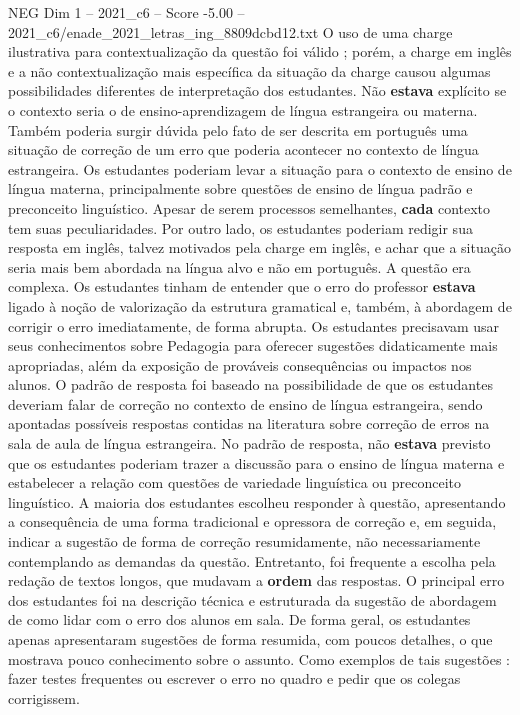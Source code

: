 \begin{textsample}{NEG Dim 1 – 2021\_c6 – Score -5.00 – 2021\_c6/enade\_2021\_letras\_ing\_8809dcbd12.txt}
O uso de uma charge ilustrativa para contextualização da questão foi válido ; porém, a charge em inglês e a não contextualização mais específica da situação da charge causou algumas possibilidades diferentes de interpretação dos estudantes.
Não \textbf{estava} explícito se o contexto seria o de ensino-aprendizagem de língua estrangeira ou materna.
Também poderia surgir dúvida pelo fato de ser descrita em português uma situação de correção de um erro que poderia acontecer no contexto de língua estrangeira.
Os estudantes poderiam levar a situação para o contexto de ensino de língua materna, principalmente sobre questões de ensino de língua padrão e preconceito linguístico.
Apesar de serem processos semelhantes, \textbf{cada} contexto tem suas peculiaridades.
Por outro lado, os estudantes poderiam redigir sua resposta em inglês, talvez motivados pela charge em inglês, e achar que a situação seria mais bem abordada na língua alvo e não em português.
A questão era complexa.
Os estudantes tinham de entender que o erro do professor \textbf{estava} ligado à noção de valorização da estrutura gramatical e, também, à abordagem de corrigir o erro imediatamente, de forma abrupta.
Os estudantes precisavam usar seus conhecimentos sobre Pedagogia para oferecer sugestões didaticamente mais apropriadas, além da exposição de prováveis consequências ou impactos nos alunos.
O padrão de resposta foi baseado na possibilidade de que os estudantes deveriam falar de correção no contexto de ensino de língua estrangeira, sendo apontadas possíveis respostas contidas na literatura sobre correção de erros na sala de aula de língua estrangeira.
No padrão de resposta, não \textbf{estava} previsto que os estudantes poderiam trazer a discussão para o ensino de língua materna e estabelecer a relação com questões de variedade linguística ou preconceito linguístico.
A maioria dos estudantes escolheu responder à questão, apresentando a consequência de uma forma tradicional e opressora de correção e, em seguida, indicar a sugestão de forma de correção resumidamente, não necessariamente contemplando as demandas da questão.
Entretanto, foi frequente a escolha pela redação de textos longos, que mudavam a \textbf{ordem} das respostas.
O principal erro dos estudantes foi na descrição técnica e estruturada da sugestão de abordagem de como lidar com o erro dos alunos em sala.
De forma geral, os estudantes apenas apresentaram sugestões de forma resumida, com poucos detalhes, o que mostrava pouco conhecimento sobre o assunto.
Como exemplos de tais sugestões : fazer testes frequentes ou escrever o erro no quadro e pedir que os colegas corrigissem.

\end{textsample}
